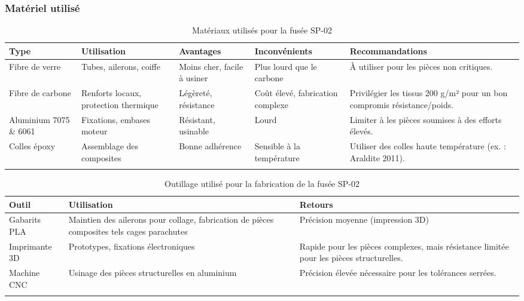 \subsubsection{Matériel utilisé}

\begin{longtable}{|p{2cm}|p{4cm}|p{3cm}|p{3cm}|p{3cm}|}
    \hline
    \textbf{Type} & \textbf{Utilisation} & \textbf{Avantages} & \textbf{Inconvénients} & \textbf{Recommandations} \\
    \hline
    Fibre de verre & Tubes, ailerons, coiffe & Moins cher, facile à usiner & Plus lourd que le carbone & À utiliser pour les pièces non critiques. \\
    \hline
    Fibre de carbone & Renforts locaux, protection thermique & Légèreté, résistance & Coût élevé, fabrication complexe & Privilégier les tissus 200 g/m² pour un bon compromis résistance/poids. \\
    \hline
    Aluminium 7075 \& 6061 & Fixations, embases moteur & Résistant, usinable & Lourd & Limiter à les pièces soumises à des efforts élevés. \\
    \hline
    Colles époxy & Assemblage des composites & Bonne adhérence & Sensible à la température & Utiliser des colles haute température (ex. : Araldite 2011). \\
    \hline
    \caption{Matériaux utilisés pour la fusée SP-02}
    \label{tab:materiaux}
\end{longtable}

\begin{longtable}{|p{4cm}|p{4.5cm}|p{6.5cm}|}
    \hline
    \textbf{Outil} & \textbf{Utilisation} & \textbf{Retours} \\
    \hline
    Gabarits PLA & Maintien des ailerons pour collage, fabrication de pièces composites tels cages parachutes & Précision moyenne (impression 3D) \\
    \hline
    Imprimante 3D & Prototypes, fixations électroniques & Rapide pour les pièces complexes, mais résistance limitée pour les pièces structurelles. \\
    \hline
    Machine CNC & Usinage des pièces structurelles en aluminium & Précision élevée nécessaire pour les tolérances serrées. \\
    \hline
    \caption{Outillage utilisé pour la fabrication de la fusée SP-02}
    \label{tab:outillage}
\end{longtable}

